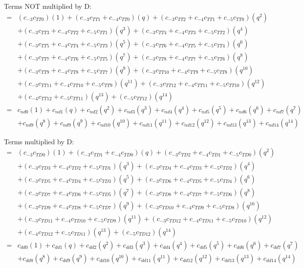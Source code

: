 \documentclass[12pt]{article}
\begin{document}
Terms NOT multiplied by D:
\begin{align}
    =& (c_{-3}c_{TT0})(1) + (c_{-3}c_{TT1} + c_{-4}c_{TT0})(q) + (c_{-3}c_{TT2} + c_{-4}c_{TT1} + c_{-5}c_{TT0})(q^2) \nonumber\\
    &+ (c_{-3}c_{TT3} + c_{-4}c_{TT2} + c_{-5}c_{TT1})(q^3) + (c_{-3}c_{TT4} + c_{-4}c_{TT3} + c_{-5}c_{TT2})(q^4) \nonumber\\
    &+ (c_{-3}c_{TT5} + c_{-4}c_{TT4} + c_{-5}c_{TT3})(q^5) + (c_{-3}c_{TT6} + c_{-4}c_{TT5} + c_{-5}c_{TT4})(q^6) \nonumber\\
    &+ (c_{-3}c_{TT7} + c_{-4}c_{TT6} + c_{-5}c_{TT5})(q^7) + (c_{-3}c_{TT8} + c_{-4}c_{TT7} + c_{-5}c_{TT6})(q^8) \nonumber\\
    &+ (c_{-3}c_{TT9} + c_{-4}c_{TT8} + c_{-5}c_{TT7})(q^9) + (c_{-3}c_{TT10} + c_{-4}c_{TT9} + c_{-5}c_{TT8})(q^{10}) \nonumber\\
    &+ (c_{-3}c_{TT11} + c_{-4}c_{TT10} + c_{-5}c_{TT9})(q^{11}) + (c_{-3}c_{TT12} +c_{-4}c_{TT11} +  c_{-5}c_{TT10})(q^{12}) \nonumber\\
    &+ (c_{-4}c_{TT12} + c_{-5}c_{TT11})(q^{13}) + (c_{-5}c_{TT12})(q^{14}) \\
    =& c_{nd0}(1) + c_{nd1}(q) + c_{nd2}(q^2) + c_{nd3}(q^3) + c_{nd4}(q^4) + c_{nd5}(q^5) + c_{nd6}(q^6) + c_{nd7}(q^7) \nonumber\\
    &+ c_{nd8}(q^8) + c_{nd9}(q^9) + c_{nd10}(q^{10}) + c_{nd11}(q^{11}) + c_{nd12}(q^{12}) + c_{nd13}(q^{13}) + c_{nd14}(q^{14})
\end{align}

Terms multiplied by D:
\begin{align}
    =& (c_{-3}c_{TD0})(1) + (c_{-3}c_{TD1} + c_{-4}c_{TD0})(q) + (c_{-3}c_{TD2} + c_{-4}c_{TD1} + c_{-5}c_{TD0})(q^2) \nonumber\\
    &+ (c_{-3}c_{TD3} + c_{-4}c_{TD2} + c_{-5}c_{TD1})(q^3) + (c_{-3}c_{TD4} + c_{-4}c_{TD3} + c_{-5}c_{TD2})(q^4) \nonumber\\
    &+ (c_{-3}c_{TD5} + c_{-4}c_{TD4} + c_{-5}c_{TD3})(q^5) + (c_{-3}c_{TD6} + c_{-4}c_{TD5} + c_{-5}c_{TD4})(q^6) \nonumber\\
    &+ (c_{-3}c_{TD7} + c_{-4}c_{TD6} + c_{-5}c_{TD5})(q^7) + (c_{-3}c_{TD8} + c_{-4}c_{TD7} + c_{-5}c_{TD6})(q^8) \nonumber\\
    &+ (c_{-3}c_{TD9} + c_{-4}c_{TD8} + c_{-5}c_{TD7})(q^9) + (c_{-3}c_{TD10} + c_{-4}c_{TD9} + c_{-5}c_{TD8})(q^{10}) \nonumber\\
    &+ (c_{-3}c_{TD11} + c_{-4}c_{TD10} + c_{-5}c_{TD9})(q^{11}) + (c_{-3}c_{TD12} + c_{-4}c_{TD11} + c_{-5}c_{TD10})(q^{12}) \nonumber\\
    &+ (c_{-4}c_{TD12} + c_{-5}c_{TD11})(q^{13}) + (c_{-5}c_{TD12})(q^{14}) \\
    =& c_{dd0}(1) + c_{dd1}(q) + c_{dd2}(q^2) + c_{dd3}(q^3) + c_{dd4}(q^4) + c_{dd5}(q^5) + c_{dd6}(q^6) + c_{dd7}(q^7) \nonumber\\
    &+ c_{dd8}(q^8) + c_{dd9}(q^9) + c_{dd10}(q^{10}) + c_{dd11}(q^{11}) + c_{dd12}(q^{12}) + c_{dd13}(q^{13}) + c_{dd14}(q^{14})
\end{align}
\end{document}
